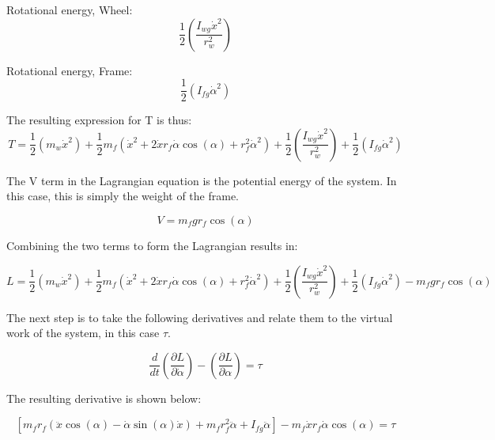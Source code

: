\documentclass{article}
\begin{document}
Rotational energy, Wheel:
\begin{equation}
\frac{1}{2} \left(   \frac{I_{wg} \dot{x}^2}     {r_{w}^2  } \right)
\end{equation}

Rotational energy, Frame:
\begin{equation}
\frac{1}{2} (I_{fg} \dot{\alpha}^2 )
\end{equation}

The resulting expression for T is thus:
\begin{equation}
T = \frac{1}{2} (m_{w} \dot{x}^2) + \frac{1}{2} m_{f} (\dot{x}^2 + 2 \dot{x} r_{f} \dot{\alpha} \cos(\alpha)   + r_{f}^2 \dot{\alpha}^2)  + \frac{1}{2} \left(   \frac{I_{wg} \dot{x}^2}     {r_{w}^2  } \right) + \frac{1}{2} (I_{fg} \dot{\alpha}^2 )
\end{equation}

The V term in the Lagrangian equation is the potential energy of the system.  In this case, this is simply the weight of the frame.

\begin{equation}
V = m_{f} g r_{f} \cos(\alpha)
\end{equation}

Combining the two terms to form the Lagrangian results in:

 \begin{equation}
 L = \frac{1}{2} (m_{w} \dot{x}^2) + \frac{1}{2} m_{f} (\dot{x}^2 + 2 \dot{x} r_{f} \dot{\alpha} \cos(\alpha)   + r_{f}^2 \dot{\alpha}^2)  + \frac{1}{2} \left(   \frac{I_{wg} \dot{x}^2}     {r_{w}^2  } \right) + \frac{1}{2} (I_{fg} \dot{\alpha}^2 ) - m_{f} g r_{f} \cos(\alpha)
 \end{equation}

The next step is to take the following derivatives and relate them to the virtual work of the system, in this case $\tau$.

\begin{equation}
 \frac{d}{dt} \left( \frac{\partial L}{\partial \dot{\alpha}} \right) - \left( \frac{\partial L}{\partial \alpha} \right) = \tau 
 \end{equation}
 
 The resulting derivative is shown below:

\begin{equation}
 \left[ m_{f} r_{f}  ( \ddot{x} \cos(\alpha) - \dot{\alpha} \sin(\alpha) \dot{x}) + m_{f} r_{f}^2 \ddot{\alpha} + I_{fg} \ddot{\alpha} \right] - m_{f} \dot{x} r_{f} \dot{\alpha} \cos(\alpha) = \tau
 \end{equation}
\end{document}
